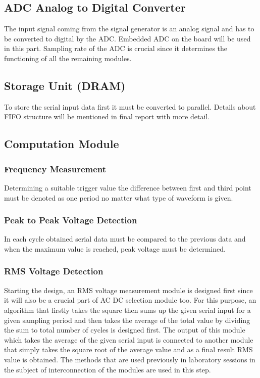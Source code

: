 \documentclass[10pt]{article}
\begin{document}
\subsection*{ADC Analog to Digital Converter}
The input signal coming from the signal generator is an analog signal and has to be converted to digital by the ADC. Embedded ADC on the board will be used in this part. Sampling rate of the ADC is crucial since it determines the functioning of all the remaining modules.
\subsection*{Storage Unit (DRAM)}
To store the serial input data first it must be converted to parallel. Details about FIFO structure will be mentioned in final report with more detail.
\subsection*{Computation Module}
\subsubsection*{Frequency Measurement}
Determining a suitable trigger value the difference between first and third point must be denoted as one period no matter what type of waveform is given.
\subsubsection*{Peak to Peak Voltage Detection}
In each cycle obtained serial data must be compared to the previous data and when the maximum value is reached, peak voltage must be determined.
\subsubsection*{RMS Voltage Detection}
Starting the design, an RMS voltage measurement module is designed first since it will also be a crucial part of AC DC selection module too. For this purpose, an algorithm that firstly takes the square then sums up the given serial input for a given sampling period and then takes the average of the total value by dividing the sum to total number of cycles is designed first. The output of this module which takes the average of the given serial input is connected to another module that simply takes the square root of the average value and as a final result RMS value is obtained. The methods that are used previously in laboratory sessions in the subject of interconnection of the modules are used in this step.
\end{document}
